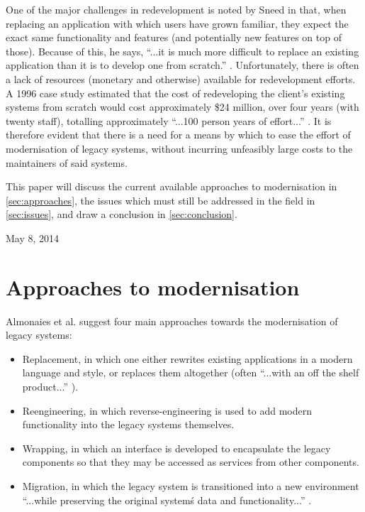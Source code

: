 \documentclass[12pt,journal,compsoc]{IEEEtran}
\begin{document}
One of the major challenges in redevelopment is noted by Sneed \cite{Sneed2011} in that, when replacing an application with which users have grown familiar, they expect the exact same functionality and features (and potentially new features on top of those). Because of this, he says, ``...it is much more difficult to replace an existing application than it is to develop one from scratch.'' \cite{Sneed2011}. Unfortunately, there is often a lack of resources (monetary and otherwise) available for redevelopment efforts. A 1996 case study \cite{Duncan1996} estimated that the cost of redeveloping the client's existing systems from scratch would cost approximately \$24 million, over four years (with twenty staff), totalling approximately ``...100 person years of effort...'' \cite{Duncan1996}. It is therefore evident that there is a need for a means by which to ease the effort of modernisation of legacy systems, without incurring unfeasibly large costs to the maintainers of said systems.

This paper will discuss the current available approaches to modernisation in \autoref{sec:approaches}, the issues which must still be addressed in the field in \autoref{sec:issues}, and draw a conclusion  in \autoref{sec:conclusion}.

\hfill May 8, 2014

\section{Approaches to modernisation}
\label{sec:approaches}

Almonaies et al. \cite{Almonaies2010} suggest four main approaches towards the modernisation of legacy systems:
\begin{itemize}
\item Replacement, in which one either rewrites existing applications in a modern language and style, or replaces them altogether (often ``...with an off the shelf product...'' \cite{Almonaies2010}).
\item Reengineering, in which reverse-engineering is used to add modern functionality into the legacy systems themselves.
\item Wrapping, in which an interface is developed to encapsulate the legacy components so that they may be accessed as services from other components.
\item Migration, in which the legacy system is transitioned into a new environment ``...while preserving the original system\'s data and functionality...'' \cite{Almonaies2010}.
\end{itemize}
\end{document}
